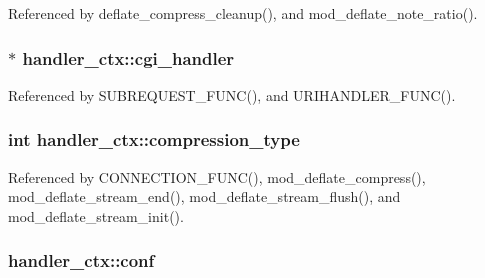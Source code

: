 Referenced by deflate\-\_\-compress\-\_\-cleanup(), and mod\-\_\-deflate\-\_\-note\-\_\-ratio().

\hypertarget{structhandler__ctx_a384e9a520fc6a9ee8aa522e9059cd165}{
\subsubsection[{cgi\-\_\-handler}]{$\ast$ handler\-\_\-ctx\-::cgi\-\_\-handler}}\label{structhandler__ctx_a384e9a520fc6a9ee8aa522e9059cd165}


Referenced by S\-U\-B\-R\-E\-Q\-U\-E\-S\-T\-\_\-\-F\-U\-N\-C(), and U\-R\-I\-H\-A\-N\-D\-L\-E\-R\-\_\-\-F\-U\-N\-C().

\hypertarget{structhandler__ctx_a9f007c8662f16f3ca8adda8c95a265ca}{
\subsubsection[{compression\-\_\-type}]{\setlength{\rightskip}{0pt plus 5cm}int handler\-\_\-ctx\-::compression\-\_\-type}}\label{structhandler__ctx_a9f007c8662f16f3ca8adda8c95a265ca}


Referenced by C\-O\-N\-N\-E\-C\-T\-I\-O\-N\-\_\-\-F\-U\-N\-C(), mod\-\_\-deflate\-\_\-compress(), mod\-\_\-deflate\-\_\-stream\-\_\-end(), mod\-\_\-deflate\-\_\-stream\-\_\-flush(), and mod\-\_\-deflate\-\_\-stream\-\_\-init().

\hypertarget{structhandler__ctx_a33b75582dd79020a83e029ff2ab56db3}{
\subsubsection[{conf}]{ handler\-\_\-ctx\-::conf}}\label{structhandler__ctx_a33b75582dd79020a83e029ff2ab56db3}


